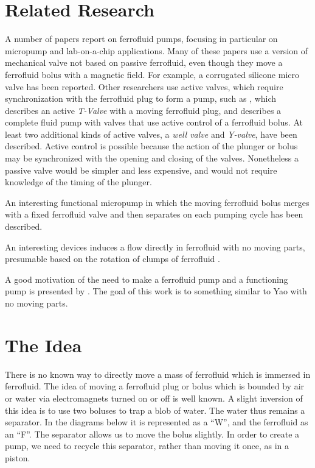 \documentclass[12pt]{article}
\begin{document}
\section{Related Research}

A number of papers report on ferrofluid pumps, focusing in particular
on micropump and lab-on-a-chip applications\cite{ozbey2015modeling,hsu2018biocompatible}.
Many of these papers use
a version of mechanical valve not based on passive
ferrofluid, even though they move a ferrofluid bolus
with a magnetic field.
For example,
a corrugated silicone micro valve\cite{yamahata2003ferrofluid,yamahata2005plastic}
has been reported.
Other researchers use active valves, which require synchronization with
the ferrofluid plug to form a pump,
such as \cite{menz2000fluidic}, which
describes an active {\em T-Valve} with a moving ferrofluid plug, and
\cite{ando2009ferrofluidic} describes a complete fluid pump with valves
that use
active control of a ferrofluid bolus.
At least two additional kinds of active valves, a {\em well valve} and
{\em Y-valve}, have
been described\cite{hartshorne2004ferrofluid}.
Active control is possible because the
action of the plunger or bolus may be synchronized with the opening and closing
of the valves.
Nonetheless a passive valve would be simpler and less
expensive, and would not require knowledge of the timing of the
plunger.

An interesting functional micropump in which the
moving ferrofluid bolus merges with a fixed ferrofluid valve and then
separates on each pumping cycle has been described\cite{hatch2001ferrofluidic}.

An interesting devices induces a flow directly in ferrofluid
with no moving parts,
presumable based on the rotation of clumps of ferrofluid
\cite{mao2011direct}.

A good motivation of the need to make a ferrofluid pump and a functioning pump
is presented by \cite{YAO2024115537}. The goal of this work is to something similar
to Yao with no moving parts.

\section{The Idea}

There is no known way to directly move a mass of ferrofluid which is immersed in
ferrofluid.
The idea of moving a ferrofluid plug or bolus which is bounded by air or water
via electromagnets turned on or off is well known. A slight inversion of this
idea is to use two boluses to trap a blob of water. The water thus remains
a separator. In the diagrams below it is represented as a ``W'',
and the ferrofluid as an ``F''.
The separator allows us to move the bolus slightly.
In order to create a pump, we need to recycle this separator, rather than
moving it once, as in a piston.
\end{document}
